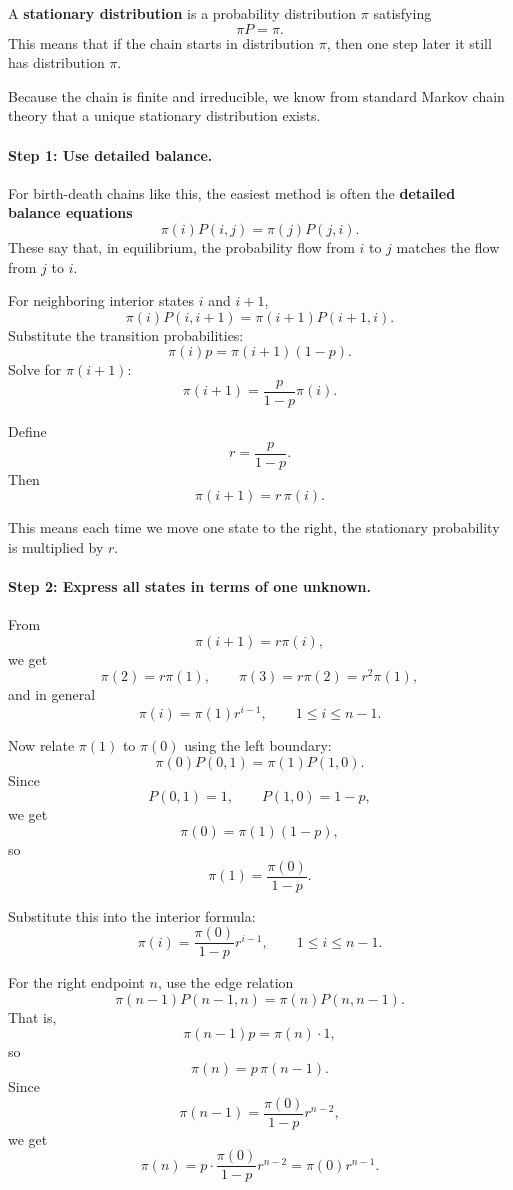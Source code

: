 \documentclass[11pt]{article}
\begin{document}
A \textbf{stationary distribution} is a probability distribution $\pi$ satisfying
\[
\pi P=\pi.
\]
This means that if the chain starts in distribution $\pi$, then one step later it still has distribution $\pi$.

Because the chain is finite and irreducible, we know from standard Markov chain theory that a unique stationary distribution exists.

\paragraph{Step 1: Use detailed balance.}

For birth-death chains like this, the easiest method is often the \textbf{detailed balance equations}
\[
\pi(i)P(i,j)=\pi(j)P(j,i).
\]
These say that, in equilibrium, the probability flow from $i$ to $j$ matches the flow from $j$ to $i$.

For neighboring interior states $i$ and $i+1$,
\[
\pi(i)P(i,i+1)=\pi(i+1)P(i+1,i).
\]
Substitute the transition probabilities:
\[
\pi(i)p=\pi(i+1)(1-p).
\]
Solve for $\pi(i+1)$:
\[
\pi(i+1)=\frac{p}{1-p}\pi(i).
\]

Define
\[
r=\frac{p}{1-p}.
\]
Then
\[
\pi(i+1)=r\,\pi(i).
\]

This means each time we move one state to the right, the stationary probability is multiplied by $r$.

\paragraph{Step 2: Express all states in terms of one unknown.}

From
\[
\pi(i+1)=r\pi(i),
\]
we get
\[
\pi(2)=r\pi(1), \qquad \pi(3)=r\pi(2)=r^2\pi(1),
\]
and in general
\[
\pi(i)=\pi(1)r^{i-1}, \qquad 1\le i\le n-1.
\]

Now relate $\pi(1)$ to $\pi(0)$ using the left boundary:
\[
\pi(0)P(0,1)=\pi(1)P(1,0).
\]
Since
\[
P(0,1)=1, \qquad P(1,0)=1-p,
\]
we get
\[
\pi(0)=\pi(1)(1-p),
\]
so
\[
\pi(1)=\frac{\pi(0)}{1-p}.
\]

Substitute this into the interior formula:
\[
\pi(i)=\frac{\pi(0)}{1-p}r^{i-1}, \qquad 1\le i\le n-1.
\]

For the right endpoint $n$, use the edge relation
\[
\pi(n-1)P(n-1,n)=\pi(n)P(n,n-1).
\]
That is,
\[
\pi(n-1)p=\pi(n)\cdot 1,
\]
so
\[
\pi(n)=p\,\pi(n-1).
\]
Since
\[
\pi(n-1)=\frac{\pi(0)}{1-p}r^{n-2},
\]
we get
\[
\pi(n)=p\cdot \frac{\pi(0)}{1-p}r^{n-2}
=\pi(0)r^{n-1}.
\]
\end{document}

